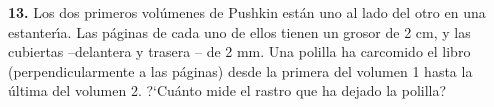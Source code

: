 \documentclass[12pt, spanish]{article}  %
\begin{document}
{\bf 13.} Los dos primeros vol\'umenes de Pushkin est\'an uno al lado del otro en una estanter\'{\i}a. 
Las p\'aginas de cada uno de ellos tienen un grosor de 2 cm, y las cubiertas --delantera y trasera 
-- de 2 mm. Una polilla ha carcomido el libro (perpendicularmente a las p\'aginas) desde la primera del volumen 1 hasta
 la \'ultima del volumen 2.
?`Cu\'anto mide el rastro que ha dejado la polilla?
\end{document}
